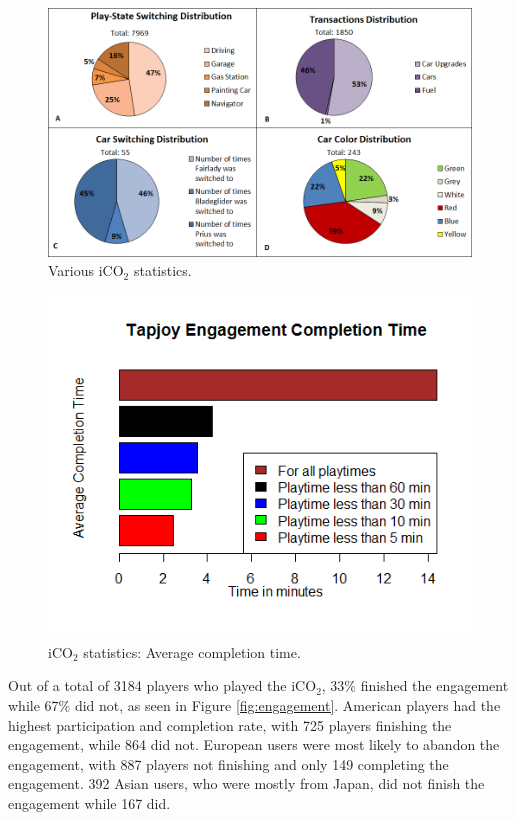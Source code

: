 \documentclass[preprint,authoryear,12pt]{elsarticle}
\begin{document}
\begin{figure}[htb]
	\begin{center}
		\includegraphics[width=.95\linewidth]{ijhcs14-img/4diagrams2}
		\caption{Various iCO$_2$ statistics.\label{fig:4diagrams}}
	\end{center}
\end{figure}

\begin{figure}[htb]
	\begin{center}
		\includegraphics[width=.8\linewidth]{ijhcs14-img/time}
		\caption{iCO$_2$ statistics: Average completion time.\label{fig:time}}
	\end{center}
\end{figure}


Out of a total of 3184 players who played the iCO$_2$, 33\% finished the engagement while 67\% did not, as seen in Figure \ref{fig:engagement}. American players had the highest participation and completion rate, with 725 players finishing the engagement, while 864 did not. European users were most likely to abandon the engagement, with 887 players not finishing and only 149 completing the engagement. 392 Asian users, who were mostly from Japan, did not finish the engagement while 167 did.
\end{document}
